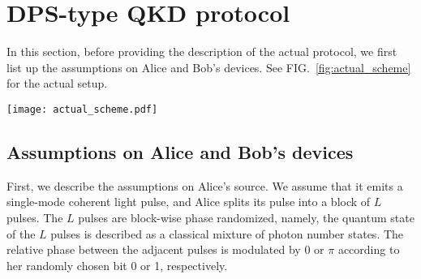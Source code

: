 \documentclass[twocolumn,superscriptaddress,pra,footinbib,notitlepage]{revtex4-1}
\newcommand{\1}{\mbox{1}\hspace{-0.25em}\mbox{l}}
\begin{document}
\section{DPS-type QKD protocol}
\label{sec:DPS-type-QKD}
In this section, before providing the description of the actual protocol, we first list up the assumptions on Alice and Bob's devices.
See FIG.~\ref{fig:actual_scheme} for the actual setup. 
\begin{figure*}[t]
\begin{center}
\texttt{[image: actual\_scheme.pdf]}
\caption{Schematics of the SNRDPS protocol for $L=7$ and $\mathcal{R}=\{1,6,2,5\}$. Alice sends 7 coherent pulses after she applies a random phase shift $\delta$ or $\delta+\pi$ to each of the pulses with a phase modulator (PM), where $\delta$ is chosen uniformly and at random from $[0, 2\pi)$. After Bob receives the incoming 7 pulses, he splits them into two blocks of 7 pulses with the first beam splitter (BS1), and shifts backward by $rT$ to one of the blocks. Here, $T$ denotes the interval between two adjacent pulses of the incoming block. By using the second beam splitter (BS2) and two photon-number-resolving detectors (D0 and D1), he observes the relative phase of two pulses in the block.
Note that, each bit in the sifted key is generated from a block where Bob has detected one photon from one pair of the interfering pulses and has detected the vacuum in all the other pulses.
We call such an event \textit{detected} event.
For example, if $r=2$ is chosen and Bob detects exactly one photon in the pair of ($3^\mathrm{rd}$, $5^\mathrm{th}$)-interfering pulses and detects the vacuum in all of the other pulses, he obtains the relative phase between the $3^\mathrm{rd}$ and the $5^\mathrm{th}$ interfering pulses.
If the relative phase is $0~(\pi)$, he obtains the sifted bit $s_\textrm{B}=0~(1)$.}
\label{fig:actual_scheme}
\end{center}
\end{figure*}

\subsection{Assumptions on Alice and Bob's devices}
%
First, we describe the assumptions on Alice's source. We assume that it emits a single-mode coherent light pulse, and Alice splits its pulse into a block of $L$ pulses.
The $L$ pulses are block-wise phase randomized, namely, the quantum state of the $L$ pulses is described as a classical mixture of photon number states.
The relative phase between the adjacent pulses is modulated by 0 or $\pi$ according to her randomly chosen bit 0 or 1, respectively.
\end{document}
